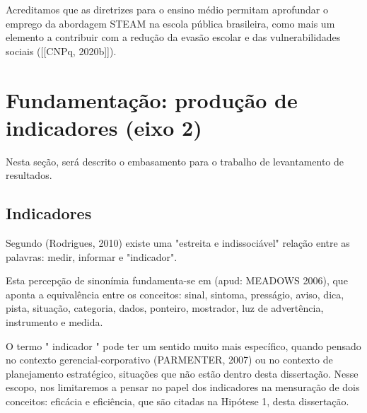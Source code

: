 \noindent\begin{center}\mbox{\centering{}}\end{center}


Acreditamos que as diretrizes para o ensino médio permitam aprofundar o emprego da abordagem STEAM na escola pública brasileira, como mais um elemento a contribuir com a redução da evasão escolar e das vulnerabilidades sociais  ([[CNPq, 2020b]]).

\section[Fundamentação: produção de indicadores (eixo 2)]{Fundamentação: produção de indicadores (eixo 2)}\label{Fundamentação: produção de indicadores (eixo 2)}
Nesta seção, será descrito o embasamento para o trabalho de levantamento de resultados.

\subsection[Indicadores]{Indicadores}\label{Indicadores}
Segundo (Rodrigues, 2010) existe uma "estreita e indissociável" relação entre as palavras: medir, informar e "indicador".

Esta percepção de sinonímia fundamenta-se em (apud: MEADOWS 2006), que aponta a equivalência entre os conceitos: sinal, sintoma, presságio, aviso, dica, pista, situação, categoria, dados, ponteiro, mostrador, luz de advertência, instrumento e medida.

O termo " indicador " pode ter um sentido muito mais específico, quando pensado no contexto gerencial-corporativo (PARMENTER, 2007) ou no contexto de planejamento estratégico, situações que não estão dentro desta dissertação. Nesse escopo, nos limitaremos a pensar no papel dos indicadores na mensuração de dois conceitos: eficácia e eficiência, que são citadas na Hipótese 1, desta dissertação.

